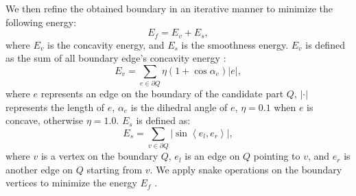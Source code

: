 We then refine the obtained boundary in an iterative manner to minimize the following energy:
$$
E_{f}=E_{v}+E_{s},
$$
where $E_{v}$ is the concavity energy, and $E_{s}$ is the smoothness energy. $E_{v}$ is defined as the sum of all boundary edge's concavity energy \cite{hierarchicalmeshdecompositionayellettog2003}:
$$
E_{v}=\sum_{e\in \partial Q}\eta(1+\cos\alpha_{e})|e|,
$$
where $e$ represents an edge on the boundary of the candidate part $Q$, $\left| \cdot \right|$ represents the length of $e$, $\alpha_{e}$ is the dihedral angle of $e$, $\eta=0.1$ when $e$ is concave, otherwise $\eta=1.0$.
$E_{s}$ is defined as:
\[{E_s} = \sum\limits_{v \in \partial Q} {\left| {\sin\left\langle {{e_l},{e_r}} \right\rangle } \right|},\]
where $v$ is a vertex on the boundary $Q$, $e_l$ is an edge on $Q$ pointing to $v$, and $e_r$ is another edge on $Q$ starting from $v$. We apply snake operations on the boundary vertices to minimize the energy $E_{f}$ \cite{CGF:CGF947}.
